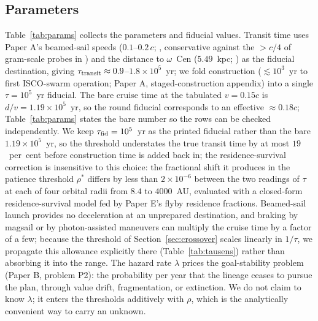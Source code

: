 \documentclass[11pt]{article}
\begin{document}
\subsection{Parameters}
\label{sec:parameters}

Table~\ref{tab:params} collects the parameters and fiducial values. Transit time uses Paper A's beamed-sail speeds ($0.1$--$0.2\,c$; \citealt{Hoang2017}, conservative against the $>c/4$ of gram-scale probes in \citealt{Lubin2016}) and the distance to $\omega$~Cen ($5.49$~kpc; \citealt{Haberle2025oMEGACatVI}) as the fiducial destination, giving $\tau_{\rm transit} \approx 0.9$--$1.8\times10^{5}$~yr; we fold construction ($\lesssim 10^{3}$~yr to first ISCO-swarm operation; Paper A, staged-construction appendix) into a single $\tau = 10^{5}$~yr fiducial. The bare cruise time at the tabulated $v = 0.15c$ is $d/v = 1.19\times10^{5}$~yr, so the round fiducial corresponds to an effective $\approx 0.18c$; Table~\ref{tab:params} states the bare number so the rows can be checked independently. We keep $\tau_{\rm fid} = 10^{5}$~yr as the printed fiducial rather than the bare $1.19\times10^{5}$~yr, so the threshold understates the true transit time by at most $19$~per~cent before construction time is added back in; the residence-survival correction is insensitive to this choice: the fractional shift it produces in the patience threshold $\rho^{*}$ differs by less than $2\times10^{-6}$ between the two readings of $\tau$ at each of four orbital radii from $8.4$ to $4000$~AU, evaluated with a closed-form residence-survival model fed by Paper E's flyby residence fractions. Beamed-sail launch provides no deceleration at an unprepared destination, and braking by magsail \citep{ZubrinAndrews1991,PerakisHein2016} or by photon-assisted maneuvers \citep{HellerHippke2017} can multiply the cruise time by a factor of a few; because the threshold of Section~\ref{sec:crossover} scales linearly in $1/\tau$, we propagate this allowance explicitly there (Table~\ref{tab:tausens}) rather than absorbing it into the range. The hazard rate $\lambda$ prices the goal-stability problem (Paper B, problem P2): the probability per year that the lineage ceases to pursue the plan, through value drift, fragmentation, or extinction. We do not claim to know $\lambda$; it enters the thresholds additively with $\rho$, which is the analytically convenient way to carry an unknown.
\end{document}

